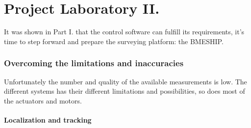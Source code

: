 \part{Project Laboratory II.}
\setcounter{section}{0}

It was shown in Part I. that the control software can fulfill its requirements, it's time to step forward and prepare the surveying platform: the BMESHIP.









\section{Overcoming the limitations and inaccuracies}

Unfortunately the number and quality of the available measurements is low. The different systems has their different limitations and possibilities, so does most of the actuators and motors.





\subsection{Localization and tracking}

